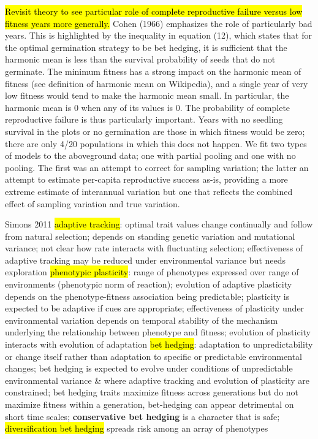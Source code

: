 \documentclass[12pt, oneside, titlepage]{article}   	%
\begin{document}
{\hl{Revisit theory to see particular role of complete reproductive failure versus low fitness years more generally.} Cohen (1966) emphasizes the role of particularly bad years. This is highlighted by the inequality in equation (12), which states that for the optimal germination strategy to be bet hedging, it is sufficient that the harmonic mean is less than the survival probability of seeds that do not germinate. The minimum fitness has a strong impact on the harmonic mean of fitness (see definition of harmonic mean on Wikipedia), and a single year of very low fitness would tend to make the harmonic mean small. In particular, the harmonic mean is 0 when any of its values is 0. The probability of complete reproductive failure is thus particularly important. Years with no seedling survival in the plots or no germination are those in which fitness would be zero; there are only 4/20 populations in which this does not happen. We fit two types of models to the aboveground data; one with partial pooling and one with no pooling. The first was an attempt to correct for sampling variation; the latter an attempt to estimate per-capita reproductive success as-is, providing a more extreme estimate of interannual variation but one that reflects the combined effect of sampling variation and true variation.



Simons 2011
\hl{adaptive tracking}: optimal trait values change continually and follow from natural selection; depends on standing genetic variation and mutational variance; not clear how rate interacts with fluctuating selection; effectiveness of adaptive tracking may be reduced under environmental variance but needs exploration
\hl{phenotypic plasticity}: range of phenotypes expressed over range of environments (phenotypic norm of reaction); evolution of adaptive plasticity depends on the phenotype-fitness association being predictable; plasticity is expected to be adaptive if cues are appropriate; effectiveness of plasticity under environmental variation depends on temporal stability of the mechanism underlying the relationship between phenotype and fitness; evolution of plasticity interacts with evolution of adaptation
\hl{bet hedging}: adaptation to unpredictability or change itself rather than adaptation to specific or predictable environmental changes; bet hedging is expected to evolve under conditions of unpredictable environmental variance \& where adaptive tracking and evolution of plasticity are constrained; bet hedging traits maximize fitness across generations but do not maximize fitness within a generation, bet-hedging can appear detrimental on short time scales; \textbf{conservative bet hedging} is a character that is safe; \hl{diversification bet hedging} spreads risk among an array of phenotypes

}
\end{document}
